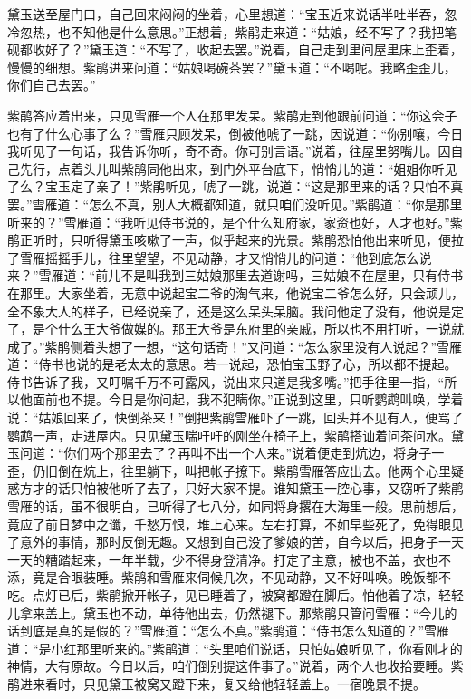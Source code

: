 \begin{parag}
    黛玉送至屋门口，自己回来闷闷的坐着，心里想道：“宝玉近来说话半吐半吞，忽冷忽热，也不知他是什么意思。”正想着，紫鹃走来道：“姑娘，经不写了？我把笔砚都收好了？”黛玉道：“不写了，收起去罢。”说着，自己走到里间屋里床上歪着，慢慢的细想。紫鹃进来问道：“姑娘喝碗茶罢？”黛玉道：“不喝呢。我略歪歪儿，你们自己去罢。”
\end{parag}


\begin{parag}
    紫鹃答应着出来，只见雪雁一个人在那里发呆。紫鹃走到他跟前问道：“你这会子也有了什么心事了么？”雪雁只顾发呆，倒被他唬了一跳，因说道：“你别嚷，今日我听见了一句话，我告诉你听，奇不奇。你可别言语。”说着，往屋里努嘴儿。因自己先行，点着头儿叫紫鹃同他出来，到门外平台底下，悄悄儿的道：“姐姐你听见了么？宝玉定了亲了！”紫鹃听见，唬了一跳，说道：“这是那里来的话？只怕不真罢。”雪雁道：“怎么不真，别人大概都知道，就只咱们没听见。”紫鹃道：“你是那里听来的？”雪雁道：“我听见侍书说的，是个什么知府家，家资也好，人才也好。”紫鹃正听时，只听得黛玉咳嗽了一声，似乎起来的光景。紫鹃恐怕他出来听见，便拉了雪雁摇摇手儿，往里望望，不见动静，才又悄悄儿的问道：“他到底怎么说来？”雪雁道：“前儿不是叫我到三姑娘那里去道谢吗，三姑娘不在屋里，只有侍书在那里。大家坐着，无意中说起宝二爷的淘气来，他说宝二爷怎么好，只会顽儿，全不象大人的样子，已经说亲了，还是这么呆头呆脑。我问他定了没有，他说是定了，是个什么王大爷做媒的。那王大爷是东府里的亲戚，所以也不用打听，一说就成了。”紫鹃侧着头想了一想，“这句话奇！”又问道：“怎么家里没有人说起？”雪雁道：“侍书也说的是老太太的意思。若一说起，恐怕宝玉野了心，所以都不提起。侍书告诉了我，又叮嘱千万不可露风，说出来只道是我多嘴。”把手往里一指，“所以他面前也不提。今日是你问起，我不犯瞒你。”正说到这里，只听鹦鹉叫唤，学着说：“姑娘回来了，快倒茶来！”倒把紫鹃雪雁吓了一跳，回头并不见有人，便骂了鹦鹉一声，走进屋内。只见黛玉喘吁吁的刚坐在椅子上，紫鹃搭讪着问茶问水。黛玉问道：“你们两个那里去了？再叫不出一个人来。”说着便走到炕边，将身子一歪，仍旧倒在炕上，往里躺下，叫把帐子撩下。紫鹃雪雁答应出去。他两个心里疑惑方才的话只怕被他听了去了，只好大家不提。谁知黛玉一腔心事，又窃听了紫鹃雪雁的话，虽不很明白，已听得了七八分，如同将身撂在大海里一般。思前想后，竟应了前日梦中之谶，千愁万恨，堆上心来。左右打算，不如早些死了，免得眼见了意外的事情，那时反倒无趣。又想到自己没了爹娘的苦，自今以后，把身子一天一天的糟踏起来，一年半载，少不得身登清净。打定了主意，被也不盖，衣也不添，竟是合眼装睡。紫鹃和雪雁来伺候几次，不见动静，又不好叫唤。晚饭都不吃。点灯已后，紫鹃掀开帐子，见已睡着了，被窝都蹬在脚后。怕他着了凉，轻轻儿拿来盖上。黛玉也不动，单待他出去，仍然褪下。那紫鹃只管问雪雁：“今儿的话到底是真的是假的？”雪雁道：“怎么不真。”紫鹃道：“侍书怎么知道的？”雪雁道：“是小红那里听来的。”紫鹃道：“头里咱们说话，只怕姑娘听见了，你看刚才的神情，大有原故。今日以后，咱们倒别提这件事了。”说着，两个人也收拾要睡。紫鹃进来看时，只见黛玉被窝又蹬下来，复又给他轻轻盖上。一宿晚景不提。
\end{parag}


